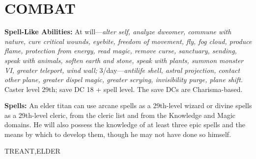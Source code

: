 \documentclass{article}
\begin{document}
{\section*{COMBAT }

\textbf{Spell-Like Abilities: }At will---\textit{alter self, analyze dweomer, commune 
with nature, cure critical wounds, eyebite, freedom of movement, fly, fog cloud, 
produce flame, protection from energy, read magic, remove curse, sanctuary, sending, 
speak with animals, soften earth and stone, speak with plants, summon monster VI, 
greater teleport, wind wall; }3/day---\textit{antilife shell, astral projection, 
contact other plane, greater dispel magic, greater scrying, invisibility purge, 
plane shift. }Caster level 29th; save DC 18 + spell level. The save DCs are Charisma-based.

\textbf{Spells:} An elder titan can use arcane spells as a 29th-level wizard or 
divine spells as a 29th-level cleric, from the cleric list and from the Knowledge 
and Magic domains. He will also possess the knowledge of at least three epic spells 
and the means by which to develop them, though he may not have done so himself. 

\vspace{12pt}
{\LARGE{}TREANT,ELDER }

}
\end{document}
